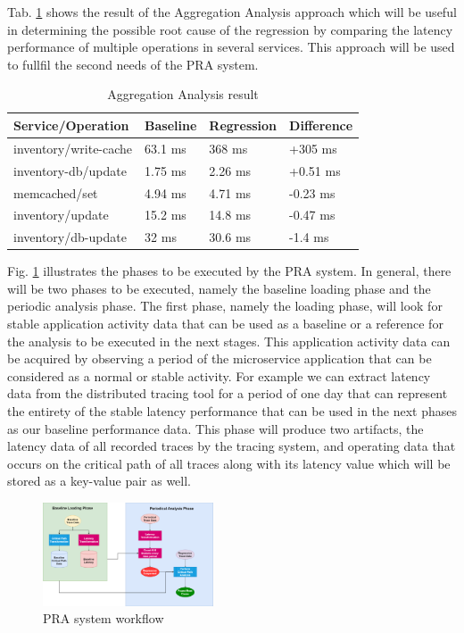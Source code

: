 \documentclass[conference]{configs/IEEEtran}
\begin{document}
Tab. \ref{aggregate} shows the result of the Aggregation Analysis approach which will be useful in determining the possible root cause of the regression by comparing the latency performance of multiple operations in several services. This approach will be used to fullfil the second needs of the PRA system.
\begin{table}[!htb]
	\caption{Aggregation Analysis result}
	\label{aggregate}
	\centering
	\begin{tabular}{|l|l|l|l|}
		\hline
		\textbf{Service/Operation} & \textbf{Baseline} & \textbf{Regression} & \textbf{Difference} \\ \hline
		inventory/write-cache & 63.1 ms & 368 ms  & +305 ms  \\ \hline
		inventory-db/update   & 1.75 ms & 2.26 ms & +0.51 ms \\ \hline
		memcached/set         & 4.94 ms & 4.71 ms & -0.23 ms \\ \hline
		inventory/update      & 15.2 ms & 14.8 ms & -0.47 ms \\ \hline
		inventory/db-update   & 32 ms   & 30.6 ms & -1.4 ms  \\ \hline
	\end{tabular}
\end{table}
\pagebreak

Fig. \ref{flow-pra} illustrates the phases to be executed by the PRA system. In general, there will be two phases to be executed, namely the baseline loading phase
and the periodic analysis phase. The first phase, namely the loading phase, will look for stable application activity data that can be used as a baseline or a reference for the analysis to be executed in the next stages. This application activity data can be acquired by observing a period of the microservice application that can be considered as a normal or stable activity. For example we can extract latency data from the distributed tracing tool for a period of one day that can represent the entirety of the stable latency performance that can be used in the next phases as our baseline performance data. This phase will produce two artifacts, the latency data of all recorded traces by the tracing system, and operating data that occurs on the critical path of all traces along with its latency value which will be stored as a key-value pair as well.
\begin{figure}[!htb]
	\centering
	\includegraphics[width=0.45\textwidth,scale=5]{resources/ch3/alur_v2.png}
	\caption{PRA system workflow}
	\label{flow-pra}
\end{figure}
\end{document}
